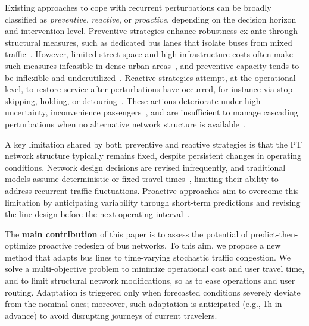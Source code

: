\documentclass[a4paper,fleqn]{cas-sc}
\begin{document}
Existing approaches to cope with recurrent perturbations can be broadly classified as \emph{preventive}, \emph{reactive}, or \emph{proactive}, depending on the decision horizon and intervention level. 
Preventive strategies enhance robustness ex ante through structural measures, such as dedicated bus lanes that isolate buses from mixed traffic~\citep{russo2022dedicated}. 
However, limited street space and high infrastructure costs often make such measures infeasible in dense urban areas~\citep{li2009evaluation}, and preventive capacity tends to be inflexible and underutilized~\citep{ITF2024, ITF2025}.
%
Reactive strategies attempt, at the operational level, to restore service after perturbations have occurred, for instance via stop-skipping, holding, or detouring~\citep{peled2021quality, tang2018optimal, zheng2023multi}. 
These actions deteriorate under high uncertainty, inconvenience passengers~\citep[\S{}2]{GkiotsalitisCats2021}, and are insufficient to manage cascading perturbations when no alternative network structure is available~\citep{mahdavi2024resilience}.


A key limitation shared by both preventive and reactive strategies is that the PT network structure typically remains fixed, despite persistent changes in operating conditions. 
Network design decisions are revised infrequently, and traditional models assume deterministic or fixed travel times~\citep{Fonseca2020, BuechelCorman2020}, limiting their ability to address recurrent traffic fluctuations.
%
Proactive approaches aim to overcome this limitation by anticipating variability through short-term predictions and revising the line design before the next operating interval~\citep{Peled2019}. 
%

The \textbf{main contribution} of this paper is to assess the potential of predict-then-optimize proactive redesign of bus networks. To this aim, we propose a new method that adapts bus lines to time-varying stochastic traffic congestion. We solve a multi-objective problem to minimize operational cost and user travel time, and to limit structural network modifications, so as to ease operations and user routing. Adaptation is triggered only when forecasted conditions severely deviate from the nominal ones; moreover, such adaptation is anticipated (e.g., 1h in advance) to avoid disrupting journeys of current travelers. 
\end{document}
